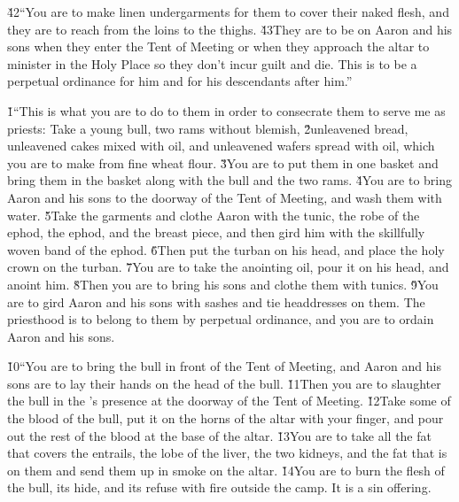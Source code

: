 \v{42}``You are to make linen undergarments for them to cover their naked flesh, and they are to reach from the loins to the thighs. \v{43}They are to be on Aaron and his sons when they enter the Tent of Meeting or when they approach the altar to minister in the Holy Place so they don't incur guilt and die. This is to be a perpetual ordinance for him and for his descendants after him.''

\v{1}``This is what you are to do to them in order to consecrate them to serve me as priests: Take a young bull, two rams without blemish, \v{2}unleavened bread, unleavened cakes mixed with oil, and unleavened wafers spread with oil, which you are to make from fine wheat flour. \v{3}You are to put them in one basket and bring them in the basket along with the bull and the two rams. \v{4}You are to bring Aaron and his sons to the doorway of the Tent of Meeting, and wash them with water. \v{5}Take the garments and clothe Aaron with the tunic, the robe of the ephod, the ephod, and the breast piece, and then gird him with the skillfully woven band of the ephod. \v{6}Then put the turban on his head, and place the holy crown on the turban. \v{7}You are to take the anointing oil, pour it on his head, and anoint him. \v{8}Then you are to bring his sons and clothe them with tunics. \v{9}You are to gird Aaron and his sons with sashes and tie headdresses on them. The priesthood is to belong to them by perpetual ordinance, and you are to ordain Aaron and his sons.

\v{10}``You are to bring the bull in front of the Tent of Meeting, and Aaron and his sons are to lay their hands on the head of the bull. \v{11}Then you are to slaughter the bull in the 's presence at the doorway of the Tent of Meeting. \v{12}Take some of the blood of the bull, put it on the horns of the altar with your finger, and pour out the rest of the blood at the base of the altar. \v{13}You are to take all the fat that covers the entrails, the lobe of the liver, the two kidneys, and the fat that is on them and send them up in smoke on the altar. \v{14}You are to burn the flesh of the bull, its hide, and its refuse with fire outside the camp. It is a sin offering.

